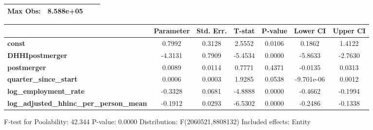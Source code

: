 \documentclass{report}
\begin{document}
\begin{center}
\begin{tabular}{lclc}
\textbf{Max Obs:}                                &      8.588e+05       & \textbf{                     }   &                  \\
\bottomrule
\end{tabular}
\begin{tabular}{lcccccc}
                                                 & \textbf{Parameter} & \textbf{Std. Err.} & \textbf{T-stat} & \textbf{P-value} & \textbf{Lower CI} & \textbf{Upper CI}  \\
\midrule
\textbf{const}                                   &       0.7992       &       0.3128       &      2.5552     &      0.0106      &       0.1862      &       1.4122       \\
\textbf{DHHIpostmerger}                          &      -4.3131       &       0.7909       &     -5.4534     &      0.0000      &      -5.8633      &      -2.7630       \\
\textbf{postmerger}                              &       0.0089       &       0.0114       &      0.7771     &      0.4371      &      -0.0135      &       0.0313       \\
\textbf{quarter\_since\_start}                   &       0.0006       &       0.0003       &      1.9285     &      0.0538      &     -9.701e-06    &       0.0012       \\
\textbf{log\_employment\_rate}                   &      -0.3328       &       0.0681       &     -4.8888     &      0.0000      &      -0.4662      &      -0.1994       \\
\textbf{log\_adjusted\_hhinc\_per\_person\_mean} &      -0.1912       &       0.0293       &     -6.5302     &      0.0000      &      -0.2486      &      -0.1338       \\
\bottomrule
\end{tabular}
\end{center}

F-test for Poolability: 42.344 \newline
 P-value: 0.0000 \newline
 Distribution: F(2060521,8808132) \newline
  \newline
 Included effects: Entity
\end{document}
